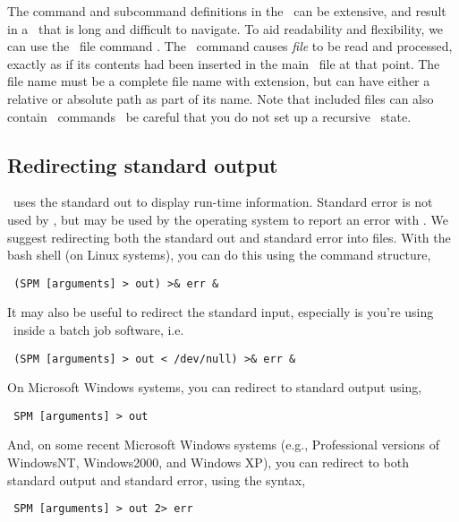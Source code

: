 The command and subcommand definitions in the \config\ can be extensive, and result in a \config\ that is long and difficult to navigate. To aid readability and flexibility, we can use the \config\ file command . The \ command causes \emph{file} to be read and processed, exactly as if its contents had been inserted in the main \config\ file at that point. The file name must be a complete file name with extension, but can have either a relative or absolute path as part of its name. Note that included files can also contain \ commands \textemdash\ be careful that you do not set up a recursive \ state.

\subsection{Redirecting standard output\label{sec:redirecting-stdout}}

\SPM\ uses the standard out to display run-time information. Standard error is not used by \SPM, but may be used by the operating system to report an error with \SPM. We suggest redirecting both the standard out and standard error into files. With the bash shell (on Linux systems), you can do this using the command structure,

\begin{verbatim} (SPM [arguments] > out) >& err &\end{verbatim}

It may also be useful to redirect the standard input, especially is you're using \SPM\ inside a batch job software, i.e. 

\begin{verbatim} (SPM [arguments] > out < /dev/null) >& err &\end{verbatim}

On Microsoft Windows systems, you can redirect to standard output using,

\begin{verbatim} SPM [arguments] > out\end{verbatim}

And, on some recent Microsoft Windows systems (e.g., Professional versions of WindowsNT, Windows2000, and Windows XP), you can redirect to both standard output and standard error, using the syntax, 

\begin{verbatim} SPM [arguments] > out 2> err\end{verbatim}

